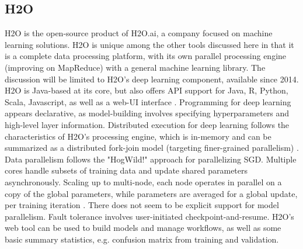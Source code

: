 \subsection{H2O}
H2O is the open-source product of H2O.ai, a company focused on machine learning solutions. H2O is unique among the other tools discussed here in that it is a complete data processing platform, with its own parallel processing engine (improving on MapReduce) with a general machine learning library. The discussion will be limited to H2O's deep learning component, available since 2014. H2O is Java-based at its core, but also offers API support for Java, R, Python, Scala, Javascript, as well as a web-UI interface \cite{candel2015deep}. Programming for deep learning appears declarative, as model-building involves specifying hyperparameters and high-level layer information. Distributed execution for deep learning follows the characteristics of H2O's processing engine, which is in-memory and can be summarized as a distributed fork-join model (targeting finer-grained parallelism) \cite{Landset2015}. Data parallelism follows the "HogWild!" \cite{recht2011hogwild} approach for parallelizing SGD. Multiple cores handle subsets of training data and update shared parameters asynchronously. Scaling up to multi-node, each node operates in parallel on a copy of the global parameters, while parameters are averaged for a global update, per training iteration \cite{candel2015deep}. There does not seem to be explicit support for model parallelism. Fault tolerance involves user-initiated checkpoint-and-resume. H2O's web tool can be used to build models and manage workflows, as well as some basic summary statistics, e.g. confusion matrix from training and validation.
